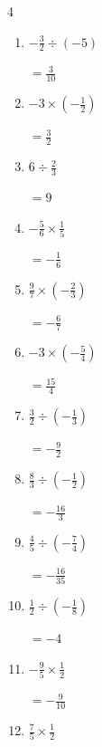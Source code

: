 \begin{multicols}{4}
\begin{enumerate}
        $\displaystyle =-1$

  \item $\displaystyle -\frac{3}{2}\div{}\left(-5\right)$

        $\displaystyle =\frac{3}{10}$

  \item $\displaystyle -3\times{}\left(-\frac{1}{2}\right)$

        $\displaystyle =\frac{3}{2}$

  \item $\displaystyle 6\div{}\frac{2}{3}$

        $\displaystyle =9$

\columnbreak %

  \item $\displaystyle -\frac{5}{6}\times{}\frac{1}{5}$

        $\displaystyle =-\frac{1}{6}$

  \item $\displaystyle \frac{9}{7}\times{}\left(-\frac{2}{3}\right)$

        $\displaystyle =-\frac{6}{7}$

  \item $\displaystyle -3\times{}\left(-\frac{5}{4}\right)$

        $\displaystyle =\frac{15}{4}$

  \item $\displaystyle \frac{3}{2}\div{}\left(-\frac{1}{3}\right)$

        $\displaystyle =-\frac{9}{2}$

  \item $\displaystyle \frac{8}{3}\div{}\left(-\frac{1}{2}\right)$

        $\displaystyle =-\frac{16}{3}$

  \item $\displaystyle \frac{4}{5}\div{}\left(-\frac{7}{4}\right)$

        $\displaystyle =-\frac{16}{35}$

  \item $\displaystyle \frac{1}{2}\div{}\left(-\frac{1}{8}\right)$

        $\displaystyle =-4$

  \item $\displaystyle -\frac{9}{5}\times{}\frac{1}{2}$

        $\displaystyle =-\frac{9}{10}$

  \item $\displaystyle \frac{7}{5}\times{}\frac{1}{2}$


\end{enumerate}
\end{multicols}
